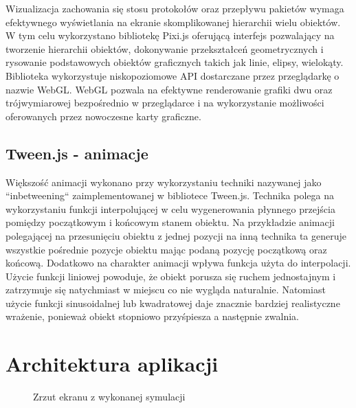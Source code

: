 Wizualizacja zachowania się stosu protokołów oraz przepływu pakietów wymaga efektywnego wyświetlania na ekranie skomplikowanej hierarchii wielu obiektów. W tym celu wykorzystano bibliotekę Pixi.js oferującą interfejs pozwalający na tworzenie hierarchii obiektów, dokonywanie przekształceń geometrycznych i rysowanie podstawowych obiektów graficznych takich jak linie, elipsy, wielokąty. Biblioteka wykorzystuje niskopoziomowe API dostarczane przez przeglądarkę o nazwie WebGL. WebGL pozwala na efektywne renderowanie grafiki dwu oraz trójwymiarowej bezpośrednio w przeglądarce i na wykorzystanie możliwości oferowanych przez nowoczesne karty graficzne.

\subsection{Tween.js - animacje}

Większość animacji wykonano przy wykorzystaniu techniki nazywanej jako ``inbetweening`` zaimplementowanej w bibliotece Tween.js. Technika polega na wykorzystaniu funkcji interpolującej w celu wygenerowania płynnego przejścia pomiędzy początkowym i końcowym stanem obiektu. 
Na przykładzie animacji polegającej na przesunięciu obiektu z jednej pozycji na inną technika ta generuje wszystkie pośrednie pozycje obiektu mając podaną pozycję początkową oraz końcową. Dodatkowo na charakter animacji wpływa funkcja użyta do interpolacji. Użycie funkcji liniowej powoduje, że obiekt porusza się ruchem jednostajnym i zatrzymuje się natychmiast w miejscu co nie wygląda naturalnie. Natomiast użycie funkcji sinusoidalnej lub kwadratowej daje znacznie bardziej realistyczne wrażenie, ponieważ obiekt stopniowo przyśpiesza a następnie zwalnia.

\section{Architektura aplikacji}

\begin{figure}[ht]
	\centerline{}
	\caption{Zrzut ekranu z wykonanej symulacji}
	\label{fig:simulation}
\end{figure}

